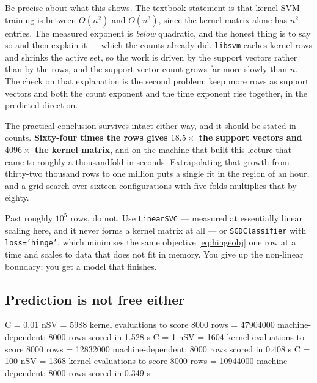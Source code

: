 \documentclass[11pt]{article}
\begin{document}
Be precise about what this shows. The textbook statement is that kernel SVM
training is between $O(n^2)$ and $O(n^3)$, since the kernel matrix alone has
$n^2$ entries. The measured exponent is \emph{below} quadratic, and the honest
thing is to say so and then explain it --- which the counts already did.
\texttt{libsvm} caches kernel rows and shrinks the active set, so the work is
driven by the support vectors rather than by the rows, and the support-vector
count grows far more slowly than $n$. The check on that explanation is the
second problem: keep more rows as support vectors and both the count exponent
and the time exponent rise together, in the predicted direction.

The practical conclusion survives intact either way, and it should be stated
in counts. \textbf{Sixty-four times the rows gives $18.5\times$ the support
vectors and $4096\times$ the kernel matrix}, and on the machine that built
this lecture that came to roughly a thousandfold in seconds. Extrapolating
that growth from thirty-two thousand rows to one million puts a single fit in
the region of an hour, and a grid search over sixteen configurations with five
folds multiplies that by eighty.

\begin{keyidea}
Past roughly $10^5$ rows, do not. Use \texttt{LinearSVC} --- measured at
essentially linear scaling here, and it never forms a kernel matrix at all
--- or \texttt{SGDClassifier} with
\texttt{loss='hinge'}, which minimises the same objective
\eqref{eq:hingeobj} one row at a time and scales to data that does not fit in
memory. You give up the non-linear boundary; you get a model that finishes.
\end{keyidea}

\subsection{Prediction is not free either}

\begin{codeout}
C =   0.01  nSV =  5988  kernel evaluations to score 8000 rows = 47904000
           machine-dependent: 8000 rows scored in 1.528 s
C =      1  nSV =  1604  kernel evaluations to score 8000 rows = 12832000
           machine-dependent: 8000 rows scored in 0.408 s
C =    100  nSV =  1368  kernel evaluations to score 8000 rows = 10944000
           machine-dependent: 8000 rows scored in 0.349 s
\end{codeout}
\end{document}

